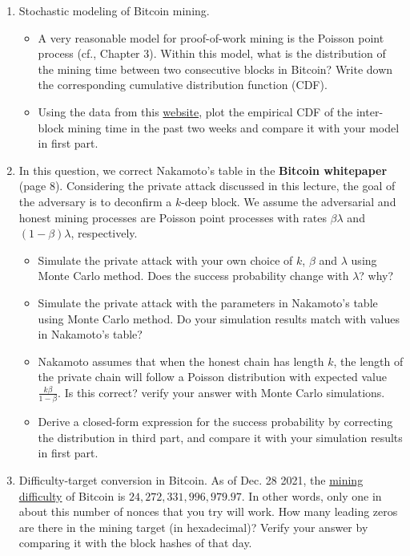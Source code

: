 \documentclass{report}
\begin{document}
\begin{enumerate}
\begin{itemize}
	\end{itemize}
	\item Stochastic modeling of Bitcoin mining.
	\begin{itemize}
		\item A very reasonable model for proof-of-work mining is the Poisson point process (cf., Chapter 3). Within this model, what is the distribution of the mining time between two consecutive blocks in Bitcoin? Write down the corresponding cumulative distribution function (CDF). 
		\item Using the data from this \href{https://www.blockchain.com/explorer/blocks/btc?page=1}{website}, plot the empirical CDF of the inter-block mining time in the past two weeks and compare it with your model in first part.
	\end{itemize}
	\item In this question, we correct Nakamoto’s table in the \textbf{Bitcoin whitepaper } (page 8). Considering the private attack discussed in this lecture, the goal of the adversary is to deconfirm a $k$-deep block. We assume the adversarial and honest mining processes are Poisson point processes with rates $\beta\lambda$ and $(1 - \beta)\lambda$, respectively.
	\begin{itemize}
		\item Simulate the private attack with your own choice of $k$, $\beta$ and $\lambda$ using Monte Carlo method. Does the success probability change with $\lambda$? why? 
		\item Simulate the private attack with the parameters in Nakamoto’s table using Monte Carlo method. Do your simulation results match with values in Nakamoto’s table?
		\item Nakamoto assumes that when the honest chain has length $k$, the length of the private chain will follow a Poisson distribution with expected value $\frac{k\beta}{1 - \beta}$. Is this correct? verify your answer with Monte Carlo simulations.
		\item Derive a closed-form expression for the success probability by correcting the distribution in third part, and compare it with your simulation results in first part.
	\end{itemize}
	\item Difficulty-target conversion in Bitcoin. As of Dec. 28 2021, the \href{https://www.blockchain.com/explorer/blocks/btc/0000000000000000000020af543d6dff0f2d5cee1834c0b4e939abbc577f0fef}{mining difficulty} of Bitcoin is $24,272,331,996,979.97$. In other words, only one in about this number of nonces that you try will work. How many leading zeros are there in the mining target (in hexadecimal)? Verify your answer by comparing it with the block hashes of that day.

\end{enumerate}
\end{document}
